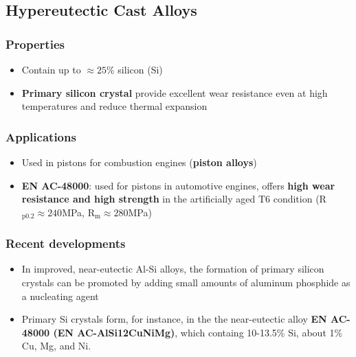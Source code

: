 \documentclass{article}
\begin{document}
\newpage
\subsection{Hypereutectic Cast Alloys}
\subsubsection{Properties}
\begin{itemize}
  \item Contain up to $\approx 25\%$ silicon (Si)
  \item \textbf{Primary silicon crystal} provide excellent wear resistance even at high temperatures and reduce thermal expansion
\end{itemize}

\subsubsection{Applications}
\begin{itemize}
  \item Used in pistons for combustion engines (\textbf{piston alloys})
  \item \textbf{EN AC-48000}: used for pistons in automotive engines, offers \textbf{high wear resistance and high strength} in the artificially aged T6 condition (R$_\text{p0.2} \approx 240$MPa, R$_\text{m} \approx 280$MPa)
\end{itemize}

\subsubsection{Recent developments}
\begin{itemize}
  \item In improved, near-eutectic Al-Si alloys, the formation of primary silicon crystals can be promoted by adding small amounts of aluminum phosphide as a nucleating agent
  \item Primary Si crystals form, for instance, in the the near-eutectic alloy \textbf{EN AC-48000 (EN AC-AlSi12CuNiMg)}, which containg 10-13.5\% Si, about 1\% Cu, Mg, and Ni. 
\end{itemize}
\end{document}
